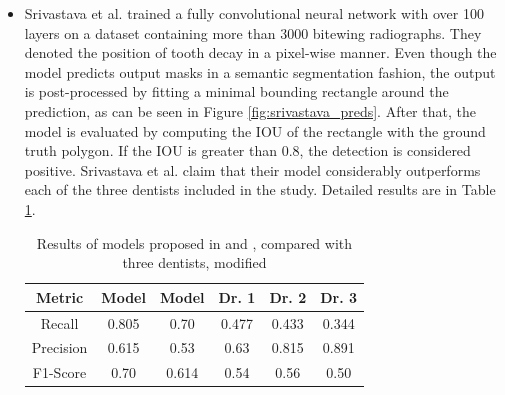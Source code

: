 \begin{itemize}
    \item{Srivastava et al. \cite{Srivastava2017}} trained a fully convolutional neural network with over 100 layers on a dataset containing more than 3000 bitewing radiographs. They denoted the position of tooth decay in a pixel-wise manner. Even though the model predicts output masks in a semantic segmentation fashion, the output is post-processed by fitting a minimal bounding rectangle around the prediction, as can be seen in Figure \ref{fig:srivastava_preds}. After that, the model is evaluated by computing the IOU of the rectangle with the ground truth polygon. If the IOU is greater than 0.8, the detection is considered positive. Srivastava et al. claim that their model considerably outperforms each of the three dentists included in the study. Detailed results are in Table \ref{tab:srivastava_results}.

          \begin{table}
              \centering
              \begin{tabular}{c||c|c|c|c|c}
                  Metric    & Model \cite{Srivastava2017} & Model \cite{Kumar2018} & Dr. 1 & Dr. 2 & Dr. 3 \\ \hline
                  Recall    & 0.805                       & 0.70                   & 0.477 & 0.433 & 0.344 \\ \hline
                  Precision & 0.615                       & 0.53                   & 0.63  & 0.815 & 0.891 \\ \hline
                  F1-Score  & 0.70                        & 0.614                  & 0.54  & 0.56  & 0.50
              \end{tabular}
              \caption{Results of models proposed in \cite{Srivastava2017} and \cite{Kumar2018}, compared with three dentists, modified}
              \label{tab:srivastava_results}
          \end{table}


\end{itemize}

